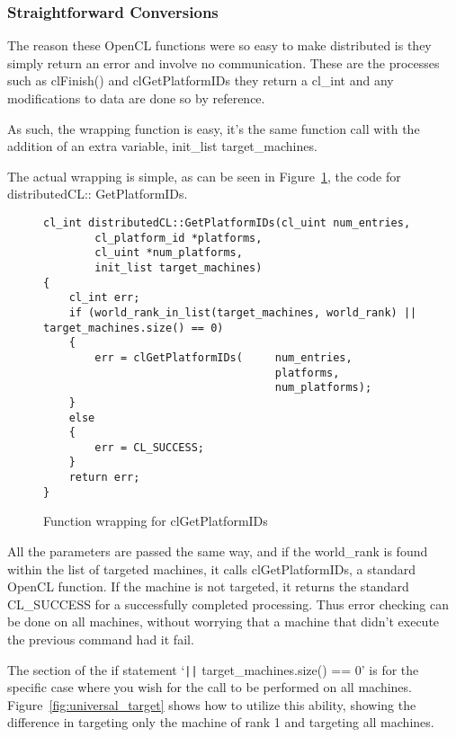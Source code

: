 \documentclass[../thesis.tex]{subfiles}
\begin{document}
    \subsubsection{Straightforward Conversions} %
    \label{ssub:straightforward_conversions}
        The reason these OpenCL functions were so easy to make distributed is they simply return an error and involve no communication. These are the processes such as clFinish() and clGetPlatformIDs they return a cl\_int and any modifications to data are done so by reference.

        As such, the wrapping function is easy, it's the same function call with the addition of an extra variable, init\_list target\_machines.

        The actual wrapping is simple, as can be seen in Figure~\ref{fig:distcl_getplatformids}, the code for distributedCL:: GetPlatformIDs.

        \begin{figure}[htbp]
            \centering
            \lstset{language=cpp}
            \begin{lstlisting}[tabsize=2]
cl_int distributedCL::GetPlatformIDs(cl_uint num_entries,
        cl_platform_id *platforms,
        cl_uint *num_platforms,
        init_list target_machines)
{
    cl_int err;
    if (world_rank_in_list(target_machines, world_rank) || target_machines.size() == 0)
    {
        err = clGetPlatformIDs(     num_entries,
                                    platforms,
                                    num_platforms);
    }
    else
    {
        err = CL_SUCCESS;
    }
    return err;
}
            \end{lstlisting}
            \caption{Function wrapping for clGetPlatformIDs}
            \label{fig:distcl_getplatformids}
        \end{figure}

    All the parameters are passed the same way, and if the world\_rank is found within the list of targeted machines, it calls clGetPlatformIDs, a standard OpenCL function. If the machine is not targeted, it returns the standard CL\_SUCCESS for a successfully completed processing. Thus error checking can be done on all machines, without worrying that a machine that didn't execute the previous command had it fail.

    The section of the if statement `\texttt{||} target\_machines.size() == 0' is for the specific case where you wish for the call to be performed on all machines. Figure~\ref{fig:universal_target} shows how to utilize this ability, showing the difference in targeting only the machine of rank 1 and targeting all machines.
\end{document}
